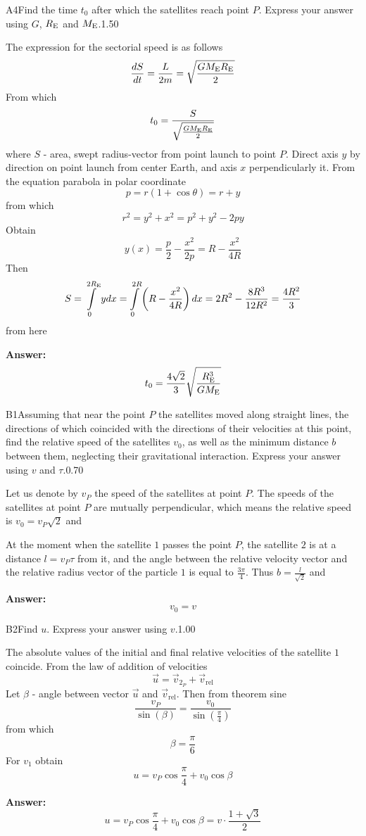 \documentclass[11pt,a4paper]{article}
\begin{document}
\begin{solcard}{A4}{Find the time $t_0$ after which the satellites reach point $P$. Express your answer using $G$, $R_\text{\text{E}}$ and $M_\text{\text{E}}$.}{1.50}

The expression for the sectorial speed is as follows $$\frac{dS}{dt}=\frac{L}{2m}=\sqrt{\frac{G{M_\text{\text{E}}}R_\text{\text{E}}}{2}} $$ From which $$t_0=\frac{S}{\sqrt{\frac{G{M_\text{\text{E}}}R_\text{\text{E}}}{2}}} $$ where $S$ - area, swept radius-vector from point launch to point $P$. Direct axis $y$ by direction on point launch from center Earth, and axis $x$ perpendicularly it. From the equation parabola in polar coordinate $$p=r(1+\cos\theta)=r+y $$ from which $$r^2=y^2+x^2=p^2+y^2-2py $$ Obtain $$y(x)=\frac{p}{2}-\frac{x^2}{2p}=R-\frac{x^2}{4R} $$ Then $$S=\int\limits_0^{2R_{\text{\text{E}}}}ydx=\int\limits_0^{2R}\left(R-\frac{x^2}{4R}\right)dx=2R^2-\frac{8R^3}{12R^2}=\frac{4R^2}{3} $$ from here

\par\smallskip\noindent\textbf{Answer:} $$t_0=\frac{4\sqrt{2}}{3}\sqrt{\frac{R^3_\text{\text{E}}}{GM_\text{\text{E}}}} $$
\end{solcard}

\begin{solcard}{B1}{Assuming that near the point $P$ the satellites moved along straight lines, the directions of which coincided with the directions of their velocities at this point, find the relative speed of the satellites $v_0$, as well as the minimum distance $b$ between them, neglecting their gravitational interaction. Express your answer using $v$ and $\tau$.}{0.70}

Let us denote by $v_P$ the speed of the satellites at point $P$. The speeds of the satellites at point $P$ are mutually perpendicular, which means the relative speed is $v_0 = v_P \sqrt{2}$ and


At the moment when the satellite $1$ passes the point $P$, the satellite $2$ is at a distance $l=v_P\tau$ from it, and the angle between the relative velocity vector and the relative radius vector of the particle $1$ is equal to $\frac{3\pi}{4}$. Thus $b=\frac{l}{\sqrt{2}}$ and

\par\smallskip\noindent\textbf{Answer:} $$v_0=v$$
\end{solcard}

\begin{solcard}{B2}{Find $u$. Express your answer using $v$.}{1.00}

The absolute values of the initial and final relative velocities of the satellite $1$ coincide. From the law of addition of velocities $$\vec{u}=\vec{v}_{2_P}+\vec{v}_\text{rel} $$ Let $\beta$ - angle between vector $\vec{u}$ and $\vec{v}_\text{rel}$. Then from theorem sine $$\frac{v_P}{\sin(\beta)}=\frac{v_0}{\sin\left(\frac{\pi}{4}\right)} $$ from which $$\beta=\frac{\pi}{6} $$ For $v_1$ obtain $$u=v_P\cos\frac{\pi}{4}+v_0\cos\beta$$

\par\smallskip\noindent\textbf{Answer:} $$u=v_P\cos\frac{\pi}{4}+v_0\cos\beta=v\cdot{\frac{1+\sqrt{3}}{2}} $$
\end{solcard}
\end{document}
